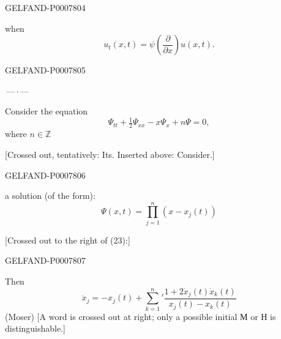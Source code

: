 \begin{GelfandAdjacentEvidence}{GELFAND-P000780}{4}

when
\[
u_t(x,t)=\psi\left(\frac{\partial}{\partial x}\right)u(x,t).
\]
\end{GelfandAdjacentEvidence}
\begin{GelfandAdjacentEvidence}{GELFAND-P000780}{5}


\begin{center}\(\text{---}\,\cdot\,\text{---}\)\end{center}

Consider the equation
\begin{equation}
\Psi_{tt}+\tfrac12\Psi_{xx}-x\Psi_x+n\Psi=0,\tag{22}
\end{equation}
where \(n\in\mathbb Z\)

[Crossed out, tentatively: Its. Inserted above: Consider.]
\end{GelfandAdjacentEvidence}
\begin{GelfandAdjacentEvidence}{GELFAND-P000780}{6}

a solution (of the form):
\begin{equation}
\Psi(x,t)=\prod_{j=1}^n(x-x_j(t))\tag{23}
\end{equation}

[Crossed out to the right of (23):]
\end{GelfandAdjacentEvidence}
\begin{GelfandAdjacentEvidence}{GELFAND-P000780}{7}


Then
\begin{equation}
\ddot x_j=-x_j(t)+\sum_{k=1}^n{}'
\frac{1+2\dot x_j(t)\dot x_k(t)}{x_j(t)-x_k(t)}
\tag{24}
\end{equation}
(Moser)
[A word is crossed out at right; only a possible initial М or Н is distinguishable.]
\end{GelfandAdjacentEvidence}
